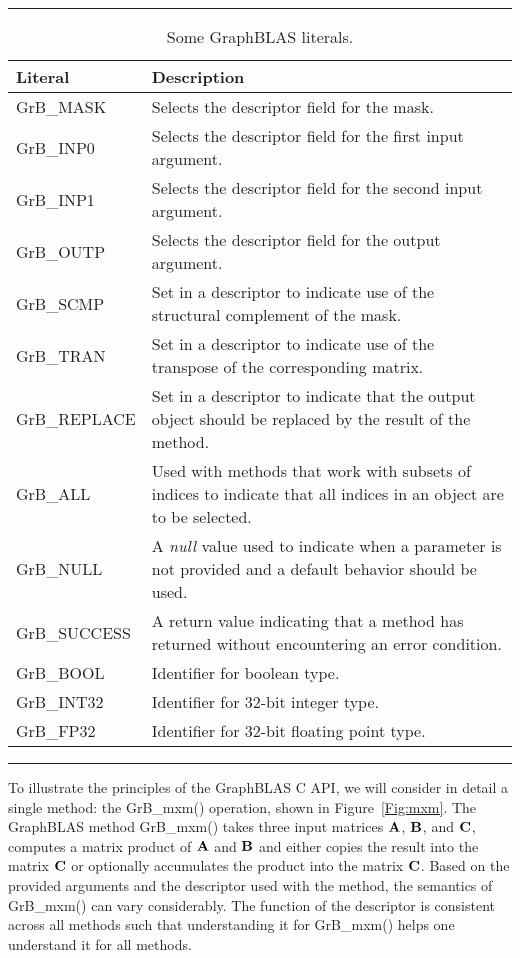 \begin{table}[h]
\hrule
\begin{center}
\caption{Some GraphBLAS literals.}
\label{Tab:GrBliterals}
\begin{tabular}{lp{5.25cm}}
Literal                 & Description  \\
\hline
	{\sf GrB\_MASK}      & Selects the descriptor field for the mask. \\
	{\sf GrB\_INP0}      & Selects the descriptor field for the first input argument. \\
	{\sf GrB\_INP1}      & Selects the descriptor field for the second input argument. \\
	{\sf GrB\_OUTP}      & Selects the descriptor field for the output argument. \\
	{\sf GrB\_SCMP}      & Set in a descriptor to indicate use of the structural complement of the mask. \\
	{\sf GrB\_TRAN}      & Set in a descriptor to indicate use of the transpose of the corresponding matrix. \\
	{\sf GrB\_REPLACE}   & Set in a descriptor to indicate that the output object should be replaced by the result of the method. \\
	{\sf GrB\_ALL}       & Used with methods that work with subsets of indices to indicate that all indices in an object are to be selected. \\
	{\sf GrB\_NULL}      & A \emph{null} value used to indicate when a parameter is not provided and a default behavior should be used. \\
	{\sf GrB\_SUCCESS}   & A return value indicating that a method has returned without encountering an error condition. \\
	{\sf GrB\_BOOL}		   & Identifier for boolean type. \\
	{\sf GrB\_INT32}	   & Identifier for 32-bit integer type. \\
	{\sf GrB\_FP32}		   & Identifier for 32-bit floating point type. \\
\end{tabular}
\end{center}
\hrule
\end{table}

To illustrate the principles of the GraphBLAS C API, we
will consider in detail a single method: the {\sf GrB\_mxm()} operation, shown in Figure~\ref{Fig:mxm}.
The GraphBLAS method {\sf GrB\_mxm()} takes three input matrices ${\bf A}$, ${\bf B}$, and ${\bf C}$, 
computes a matrix product of ${\bf A}$ and ${\bf B}$ and either copies the result into the matrix ${\bf C}$
or optionally accumulates the product into the matrix ${\bf C}$.  Based on the provided arguments 
and the descriptor used with the method, the semantics of {\sf GrB\_mxm()} can vary considerably.
The function of the descriptor is consistent across all methods such that understanding it for
{\sf GrB\_mxm()} helps one understand it for all methods.

